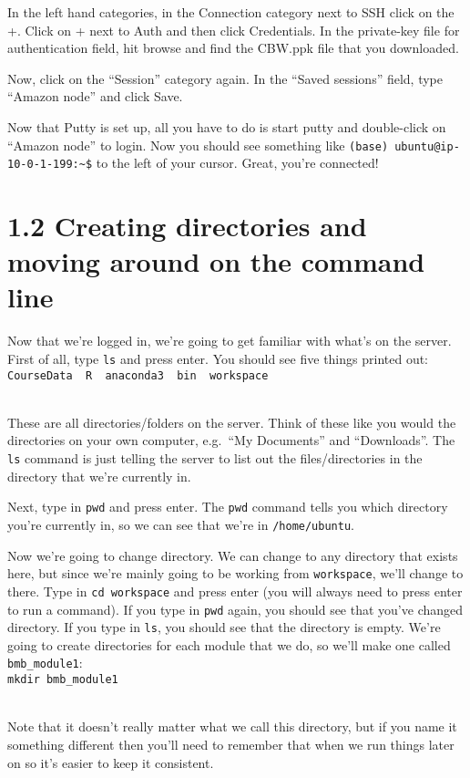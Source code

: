 \documentclass[
]{book}
\begin{document}
In the left hand categories, in the Connection category next to SSH click on the +. Click on + next to Auth and then click Credentials. In the private-key file for authentication field, hit browse and find the CBW.ppk file that you downloaded.

Now, click on the ``Session'' category again. In the ``Saved sessions'' field, type ``Amazon node'' and click Save.

Now that Putty is set up, all you have to do is start putty and double-click on ``Amazon node'' to login. Now you should see something like \texttt{(base)\ ubuntu@ip-10-0-1-199:\textasciitilde{}\$} to the left of your cursor. Great, you're connected!

\section{1.2 Creating directories and moving around on the command line}\label{creating-directories-and-moving-around-on-the-command-line}

Now that we're logged in, we're going to get familiar with what's on the server. First of all, type \texttt{ls} and press enter. You should see five things printed out:\\
\texttt{CourseData\ \ R\ \ anaconda3\ \ bin\ \ workspace}\strut \\
These are all directories/folders on the server. Think of these like you would the directories on your own computer, e.g.~``My Documents'' and ``Downloads''. The \texttt{ls} command is just telling the server to list out the files/directories in the directory that we're currently in.

Next, type in \texttt{pwd} and press enter. The \texttt{pwd} command tells you which directory you're currently in, so we can see that we're in \texttt{/home/ubuntu}.

Now we're going to change directory. We can change to any directory that exists here, but since we're mainly going to be working from \texttt{workspace}, we'll change to there. Type in \texttt{cd\ workspace} and press enter (you will always need to press enter to run a command). If you type in \texttt{pwd} again, you should see that you've changed directory. If you type in \texttt{ls}, you should see that the directory is empty. We're going to create directories for each module that we do, so we'll make one called \texttt{bmb\_module1}:\\
\texttt{mkdir\ bmb\_module1}\strut \\
Note that it doesn't really matter what we call this directory, but if you name it something different then you'll need to remember that when we run things later on so it's easier to keep it consistent.
\end{document}

